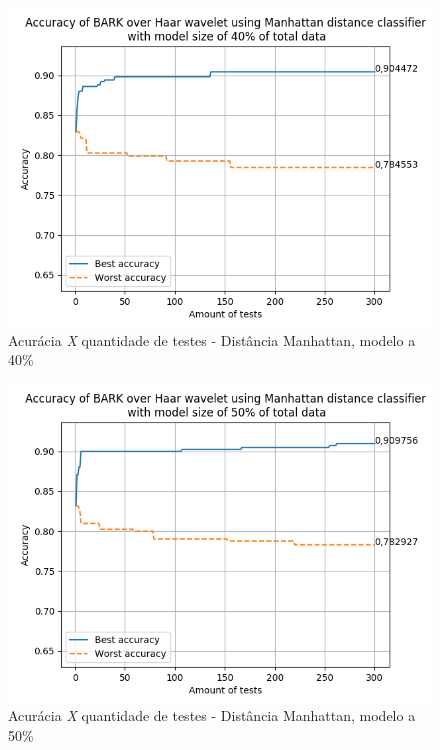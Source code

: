 \begin{myenv}{1.5}
		\newpage
		\begin{figure}[h]
			\centering
			\includegraphics{images/results/confusionMatrices/classifier_Manhattan_40.png}
			\caption{Acurácia \textit{X} quantidade de testes - Distância Manhattan, modelo a 40\%}
			\label{fig:classifiermanhattan40}
		\end{figure}
		
		
		\newpage
		\begin{figure}[h]
			\centering
			\includegraphics{images/results/confusionMatrices/classifier_Manhattan_50.png}
			\caption{Acurácia \textit{X} quantidade de testes - Distância Manhattan, modelo a 50\%}
			\label{fig:classifiermanhattan50}
		\end{figure}
		


\end{myenv}
